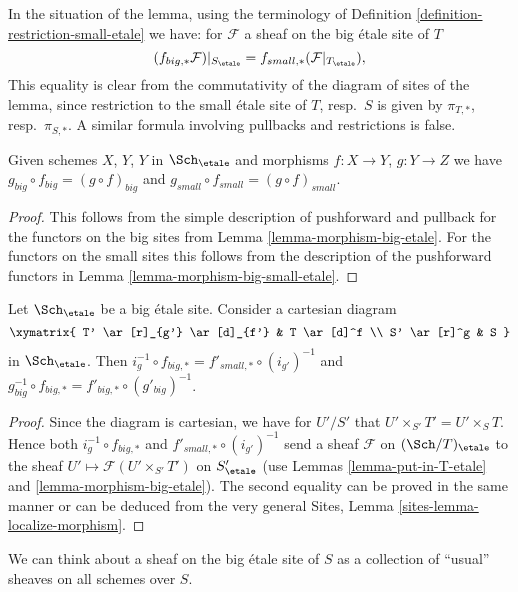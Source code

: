 \noindent
In the situation of the lemma, using the terminology of
Definition \ref{definition-restriction-small-etale}
we have: for $\mathcal{F}$ a sheaf on the big \'etale site of $T$
$$
(f_{big, *}\mathcal{F})|_{S_\etale} =
f_{small, *}(\mathcal{F}|_{T_\etale}),
$$
This equality is clear from the commutativity of the diagram of
sites of the lemma, since restriction to the small \'etale site of
$T$, resp.\ $S$ is given by $\pi_{T, *}$, resp.\ $\pi_{S, *}$. A similar
formula involving pullbacks and restrictions is false.

\begin{lemma}
\label{lemma-composition-etale}
Given schemes $X$, $Y$, $Y$ in $\Sch_\etale$
and morphisms $f : X \to Y$, $g : Y \to Z$ we have
$g_{big} \circ f_{big} = (g \circ f)_{big}$ and
$g_{small} \circ f_{small} = (g \circ f)_{small}$.
\end{lemma}

\begin{proof}
This follows from the simple description of pushforward
and pullback for the functors on the big sites from
Lemma \ref{lemma-morphism-big-etale}. For the functors
on the small sites this follows from the description of
the pushforward functors in Lemma \ref{lemma-morphism-big-small-etale}.
\end{proof}

\begin{lemma}
\label{lemma-morphism-big-small-cartesian-diagram-etale}
Let $\Sch_\etale$ be a big \'etale site. Consider a cartesian diagram
$$
\xymatrix{
T' \ar[r]_{g'} \ar[d]_{f'} & T \ar[d]^f \\
S' \ar[r]^g & S
}
$$
in $\Sch_\etale$. Then
$i_g^{-1} \circ f_{big, *} = f'_{small, *} \circ (i_{g'})^{-1}$
and $g_{big}^{-1} \circ f_{big, *} = f'_{big, *} \circ (g'_{big})^{-1}$.
\end{lemma}

\begin{proof}
Since the diagram is cartesian, we have for $U'/S'$
that $U' \times_{S'} T' = U' \times_S T$. Hence both
$i_g^{-1} \circ f_{big, *}$ and $f'_{small, *} \circ (i_{g'})^{-1}$
send a sheaf $\mathcal{F}$ on $(\Sch/T)_\etale$ to the sheaf
$U' \mapsto \mathcal{F}(U' \times_{S'} T')$ on $S'_\etale$
(use Lemmas \ref{lemma-put-in-T-etale} and \ref{lemma-morphism-big-etale}).
The second equality can be proved in the same manner or can be
deduced from the very general
Sites, Lemma \ref{sites-lemma-localize-morphism}.
\end{proof}

\noindent
We can think about a sheaf on the big \'etale site of $S$ as a collection
of ``usual'' sheaves on all schemes over $S$.

